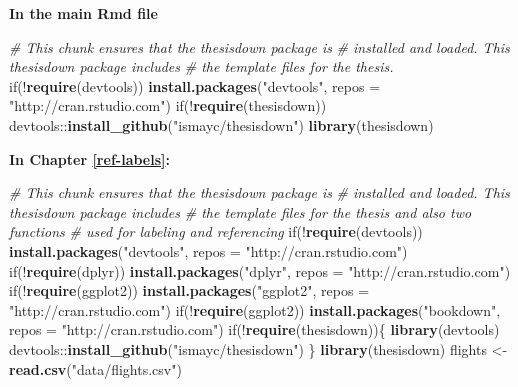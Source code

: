 \documentclass [11pt, proquest] {uwthesis}[2015/03/03]
\newenvironment{Shaded}{}{}
\newcommand{\KeywordTok}[1]{\textcolor[rgb]{0.00,0.44,0.13}{\textbf{{#1}}}}
\newcommand{\DataTypeTok}[1]{\textcolor[rgb]{0.56,0.13,0.00}{{#1}}}
\newcommand{\StringTok}[1]{\textcolor[rgb]{0.25,0.44,0.63}{{#1}}}
\newcommand{\CommentTok}[1]{\textcolor[rgb]{0.38,0.63,0.69}{\textit{{#1}}}}
\newcommand{\NormalTok}[1]{{#1}}
\begin{document}
\textbf{In the main Rmd file}
\begin{Shaded}
\begin{Highlighting}[]
\CommentTok{# This chunk ensures that the thesisdown package is}
\CommentTok{# installed and loaded. This thesisdown package includes}
\CommentTok{# the template files for the thesis.}
\NormalTok{if(!}\KeywordTok{require}\NormalTok{(devtools))}
  \KeywordTok{install.packages}\NormalTok{(}\StringTok{"devtools"}\NormalTok{, }\DataTypeTok{repos =} \StringTok{"http://cran.rstudio.com"}\NormalTok{)}
\NormalTok{if(!}\KeywordTok{require}\NormalTok{(thesisdown))}
  \NormalTok{devtools::}\KeywordTok{install_github}\NormalTok{(}\StringTok{"ismayc/thesisdown"}\NormalTok{)}
\KeywordTok{library}\NormalTok{(thesisdown)}
\end{Highlighting}
\end{Shaded}
\textbf{In Chapter \ref{ref-labels}:}
\begin{Shaded}
\begin{Highlighting}[]
\CommentTok{# This chunk ensures that the thesisdown package is}
\CommentTok{# installed and loaded. This thesisdown package includes}
\CommentTok{# the template files for the thesis and also two functions}
\CommentTok{# used for labeling and referencing}
\NormalTok{if(!}\KeywordTok{require}\NormalTok{(devtools))}
  \KeywordTok{install.packages}\NormalTok{(}\StringTok{"devtools"}\NormalTok{, }\DataTypeTok{repos =} \StringTok{"http://cran.rstudio.com"}\NormalTok{)}
\NormalTok{if(!}\KeywordTok{require}\NormalTok{(dplyr))}
    \KeywordTok{install.packages}\NormalTok{(}\StringTok{"dplyr"}\NormalTok{, }\DataTypeTok{repos =} \StringTok{"http://cran.rstudio.com"}\NormalTok{)}
\NormalTok{if(!}\KeywordTok{require}\NormalTok{(ggplot2))}
    \KeywordTok{install.packages}\NormalTok{(}\StringTok{"ggplot2"}\NormalTok{, }\DataTypeTok{repos =} \StringTok{"http://cran.rstudio.com"}\NormalTok{)}
\NormalTok{if(!}\KeywordTok{require}\NormalTok{(ggplot2))}
    \KeywordTok{install.packages}\NormalTok{(}\StringTok{"bookdown"}\NormalTok{, }\DataTypeTok{repos =} \StringTok{"http://cran.rstudio.com"}\NormalTok{)}
\NormalTok{if(!}\KeywordTok{require}\NormalTok{(thesisdown))\{}
  \KeywordTok{library}\NormalTok{(devtools)}
  \NormalTok{devtools::}\KeywordTok{install_github}\NormalTok{(}\StringTok{"ismayc/thesisdown"}\NormalTok{)}
  \NormalTok{\}}
\KeywordTok{library}\NormalTok{(thesisdown)}
\NormalTok{flights <-}\StringTok{ }\KeywordTok{read.csv}\NormalTok{(}\StringTok{"data/flights.csv"}\NormalTok{)}
\end{Highlighting}
\end{Shaded}
\end{document}
